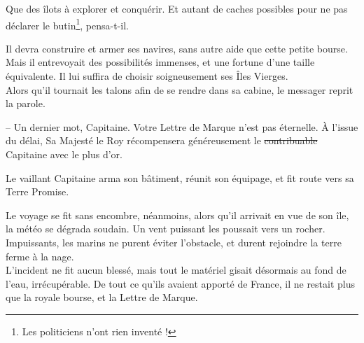 Que des îlots à explorer et conquérir. Et autant de caches possibles
pour ne pas déclarer le butin\footnote{Les politiciens n'ont rien
inventé !}, pensa-t-il.

Il devra construire et armer ses navires, sans autre aide que cette
petite bourse. Mais il entrevoyait des possibilités immenses, et une
fortune d'une taille équivalente. Il lui suffira de choisir
soigneusement ses Îles Vierges.\\

Alors qu'il tournait les talons afin de se rendre dans sa cabine, le
messager reprit la parole.

-- Un dernier mot, Capitaine. Votre Lettre de Marque n'est pas
   éternelle. À l'issue du délai, Sa Majesté le Roy récompensera
   généreusement le \st{contribuable} Capitaine avec le plus d'or.\\

\culdelampe{}

Le vaillant Capitaine arma son bâtiment, réunit son équipage, et fit
route vers sa Terre Promise.

Le voyage se fit sans encombre, néanmoins, alors qu'il arrivait en vue
de son île, la météo se dégrada soudain. Un vent puissant les poussait
vers un rocher. Impuissants, les marins ne purent éviter l'obstacle,
et durent rejoindre la terre ferme à la nage.\\

L'incident ne fit aucun blessé, mais tout le matériel gisait désormais
au fond de l'eau, irrécupérable. De tout ce qu'ils avaient apporté de
France, il ne restait plus que la royale bourse, et la Lettre de
Marque.\\


